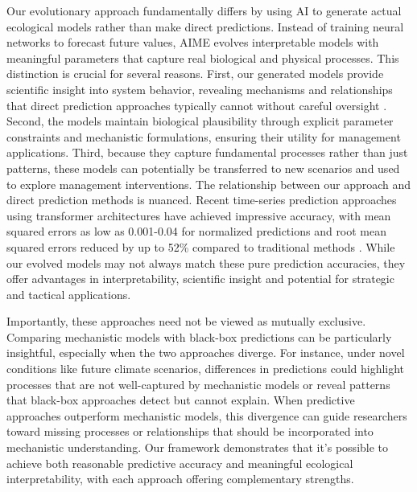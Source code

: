 Our evolutionary approach fundamentally differs by using AI to generate actual ecological models rather than make direct predictions. Instead of training neural networks to forecast future values, AIME evolves interpretable models with meaningful parameters that capture real biological and physical processes. This distinction is crucial for several reasons. First, our generated models provide scientific insight into system behavior, revealing mechanisms and relationships that direct prediction approaches typically cannot without careful oversight \citep{adams2017model}. Second, the models maintain biological plausibility through explicit parameter constraints and mechanistic formulations, ensuring their utility for management applications. Third, because they capture fundamental processes rather than just patterns, these models can potentially be transferred to new scenarios and used to explore management interventions.
The relationship between our approach and direct prediction methods is nuanced. Recent time-series prediction approaches using transformer architectures have achieved impressive accuracy, with mean squared errors as low as 0.001-0.04 for normalized predictions \citep{morales2024developing} and root mean squared errors reduced by up to 52\% compared to traditional methods \citep{gandhi2024generative}. While our evolved models may not always match these pure prediction accuracies, they offer advantages in interpretability, scientific insight and potential for strategic and tactical applications.

Importantly, these approaches need not be viewed as mutually exclusive. Comparing mechanistic models with black-box predictions can be particularly insightful, especially when the two approaches diverge. For instance, under novel conditions like future climate scenarios, differences in predictions could highlight processes that are not well-captured by mechanistic models or reveal patterns that black-box approaches detect but cannot explain. When predictive approaches outperform mechanistic models, this divergence can guide researchers toward missing processes or relationships that should be incorporated into mechanistic understanding. Our framework demonstrates that it's possible to achieve both reasonable predictive accuracy and meaningful ecological interpretability, with each approach offering complementary strengths.

